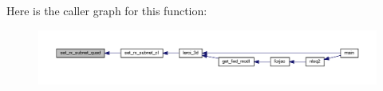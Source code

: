 Here is the caller graph for this function\+:\nopagebreak
\begin{figure}[H]
\begin{center}
\leavevmode
\includegraphics[width=350pt]{Leroi_8f90_a397597f84bff232d8a1a2f4a44e6e75f_icgraph}
\end{center}
\end{figure}
\mbox{\label{Leroi_8f90_a27012846f79c1bc36d500442dad45d7c}} 
